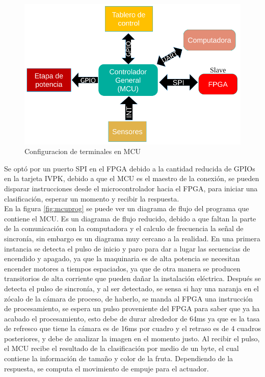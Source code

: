 \documentclass[twoside,spanish,ESP,MSc]{plantillaLabUPV}
\theoremstyle{definition}
\begin{document}
\begin{figure}
	\centering
	\includegraphics[width=0.7\linewidth]{edrawimas/pins}
	\caption{Configuracion de terminales en MCU}
	\label{fig:pins}
\end{figure}

Se optó por un puerto SPI en el FPGA debido a la cantidad reducida de GPIOs en la tarjeta IVPK, debido a que el MCU es el maestro de la conexión, se pueden disparar instrucciones desde el microcontrolador hacia el FPGA, para iniciar una clasificación, esperar un momento y recibir la respuesta.\\

En la figura \ref{fig:mcuprog} se puede ver un diagrama de flujo del programa que contiene el MCU. Es un diagrama de flujo reducido, debido a que faltan la parte de la comunicación con la computadora y el calculo de frecuencia la señal de sincronía, sin embargo es un diagrama muy cercano a la realidad. En una primera instancia se detecta el pulso de inicio y paro para dar a lugar las secuencias de encendido y apagado, ya que la maquinaria es de alta potencia se necesitan encender motores a tiempos espaciados, ya que de otra manera se producen transitorios de alta corriente que pueden dañar la instalación eléctrica. Después se detecta el pulso de sincronía, y al ser detectado, se sensa si hay una naranja en el zócalo de la cámara de proceso, de haberlo, se manda al FPGA una instrucción de procesamiento, se espera un pulso proveniente del FPGA para saber que ya ha acabado el procesamiento, esto debe de durar alrededor de 64ms ya que es la tasa de refresco que tiene la cámara es de 16ms por cuadro y el retraso es de 4 cuadros posteriores, y debe de analizar la imagen en el momento justo. Al recibir el pulso, el MCU recibe el resultado de la clasificación por medio de un byte, el cual contiene la información de tamaño y color de la fruta. Dependiendo de la respuesta, se computa el movimiento de empuje para el actuador.
\end{document}
